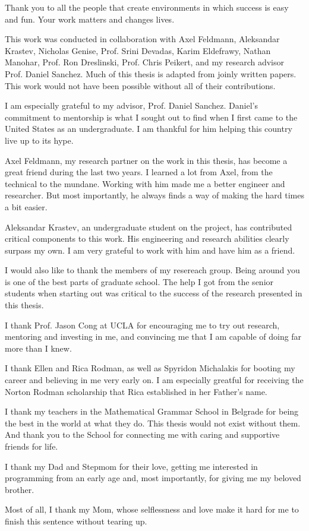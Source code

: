 Thank you to all the people that create environments in which success is easy
and fun. Your work matters and changes lives.

This work was conducted in collaboration with Axel Feldmann, Aleksandar
Krastev, Nicholas Genise, Prof. Srini Devadas, Karim Eldefrawy, Nathan Manohar,
Prof. Ron Dreslinski, Prof. Chris Peikert, and my research advisor Prof. Daniel
Sanchez. Much of this thesis is adapted from joinly written papers. This work
would not have been possible without all of their contributions.

I am especially grateful to my advisor, Prof. Daniel Sanchez. Daniel's
commitment to mentorship is what I sought out to find when I first came to the
United States as an undergraduate. I am thankful for him helping this country
live up to its hype.

Axel Feldmann, my research partner on the work in this thesis, has become a
great friend during the last two years. I learned a lot from Axel, from the
technical to the mundane. Working with him made me a better engineer and
researcher. But most importantly, he always finds a way of making the hard
times a bit easier.

Aleksandar Krastev, an undergraduate student on the project, has contributed
critical components to this work. His engineering and research abilities
clearly surpass my own. I am very grateful to work with him and have him as a
friend.

I would also like to thank the members of my resereach group. Being around you
is one of the best parts of graduate school. The help I got from the senior
students when starting out was critical to the success of the research
presented in this thesis.

I thank Prof. Jason Cong at UCLA for encouraging me to try out research,
mentoring and investing in me, and convincing me that I am capable of doing far
more than I knew.

I thank Ellen and Rica Rodman, as well as Spyridon Michalakis for booting my
career and believing in me very early on. I am especially greatful for
receiving the Norton Rodman scholarship that Rica established in her Father's
name.

I thank my teachers in the Mathematical Grammar School in Belgrade for being
the best in the world at what they do. This thesis would not exist without
them. And thank you to the School for connecting me with caring and supportive
friends for life.

I thank my Dad and Stepmom for their love, getting me interested in programming
from an early age and, most importantly, for giving me my beloved brother.

Most of all, I thank my Mom, whose selflessness and love make it hard for me to
finish this sentence without tearing up.
